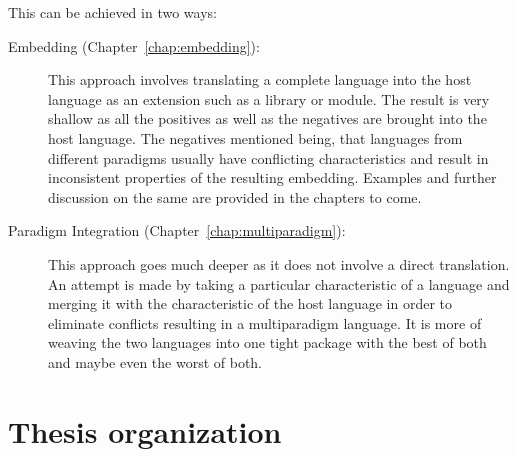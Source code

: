 \documentclass[thesis-solanki.tex]{subfiles}
\begin{document}
This can be achieved in two ways:
\begin{description}
\item [Embedding (Chapter~\ref{chap:embedding}):]

  This approach involves translating a complete language into the host language as an extension such as a
  library or module.
  The result is very shallow
  as all the positives as well as the negatives are brought into the host language.
  The negatives mentioned being, that languages from different paradigms usually have conflicting characteristics
  and result in inconsistent properties of the resulting embedding.
  Examples and further discussion on the same are
  provided in the chapters to come.

\item [Paradigm Integration (Chapter~\ref{chap:multiparadigm}):]

  This approach goes much deeper as it does not involve a direct translation.
  An attempt is made by taking a particular characteristic of a language and merging it with the characteristic of
  the host language in order to eliminate conflicts resulting in a multiparadigm language.
  It is more of weaving the two languages into one tight package with the best of both and maybe even the worst of
  both.
\end{description}


%






\section{Thesis organization}
\end{document}
